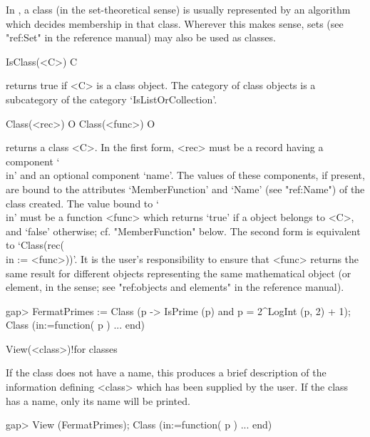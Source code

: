 
In {\CRISP}, a class (in the set-theoretical sense) is usually represented
by an algorithm which decides membership in that class. Wherever this makes
sense, sets (see "ref:Set" in the {\GAP} reference
manual) may also be used as classes.


\null


\>IsClass(<C>) C

returns true if <C> is a class object. The category of class objects is a
subcategory of the category `IsListOrCollection'.

\>Class(<rec>) O
\>Class(<func>) O

returns a class <C>. In the first form, <rec> must be a record having a
component `\\in' and an optional component `name'. The values of these
components, if present, are bound to the attributes `MemberFunction' and
`Name' (see "ref:Name") of the class created. The value bound to `\\in' must be a function
<func> which returns `true' if a {\GAP} object belongs to <C>, and `false'
otherwise; cf. "MemberFunction" below. The second form is equivalent to `Class(rec(\\in
:= <func>))'. It is the user's responsibility to ensure that <func> returns the same
result for different {\GAP} objects representing the same mathematical object (or
element, in the {\GAP} sense; see "ref:objects and elements" in the {\GAP}
reference manual).

\beginexample
gap> FermatPrimes := Class (p -> IsPrime (p) and p = 2^LogInt (p, 2) + 1); 
Class (in:=function( p ) ... end)
\endexample

\>View(<class>)!{for classes}

If the class does not have a name, this produces a brief description of the
information defining <class> which has been supplied by the user. If the
class has a name, only its name will be printed.

\begintt
gap> View (FermatPrimes);
Class (in:=function( p ) ... end)
\endtt

